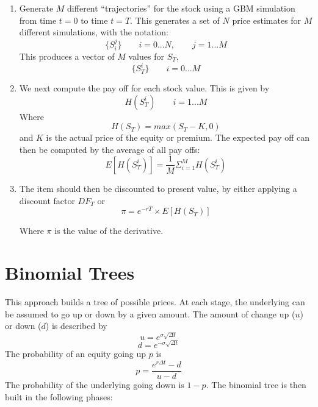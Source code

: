 \begin{enumerate}
	\item Generate $M$ different ``trajectories'' for the stock using a GBM simulation from time $t=0$ to time $t=T$. This generates a set of $N$ price estimates for $M$ different simulations, with the notation:
	\begin{equation}
		\{S_i^j\}\qquad i = 0...N,\qquad j=1...M
	\end{equation}
	This produces a vector of $M$ values for $S_T$, 
	\begin{equation}
		\{S_T^i\}\qquad i = 0...M
	\end{equation}
	
	\item We next compute the pay off for each stock value. This is given by 
	\begin{equation}
		H(S_T^i)\qquad i=1...M
	\end{equation}
	Where 
	\begin{equation}
		H(S_T)=max(S_T-K,0)
	\end{equation}
	and $K$ is the actual price of the equity or premium. The expected pay off can then be computed by the average of all pay offs:
	\begin{equation}
		E[H(S_T^i)]=\frac{1}{M}\Sigma_{i=1}^{M}H(S_T^i)
	\end{equation}
	
	\item The item should then be discounted to present value, by either applying a discount factor $DF_T$ or 
	\begin{equation}
		\pi = e^{-rT}\times E[H(S_T)]
	\end{equation}
	
	Where $\pi$ is the value of the derivative.
\end{enumerate}



\section{Binomial Trees \cite{advancedquantcpp}}

This approach builds a tree of possible prices. At each stage, the underlying can be assumed to go up or down by a given amount. The amount of change up ($u$) or down ($d$) is described by
\begin{equation}
	u=e^{\sigma\sqrt{\Delta{}t}}
\end{equation}
\begin{equation}
	d=e^{-\sigma\sqrt{\Delta{}t}}
\end{equation}
The probability of an equity going up $p$ is
\begin{equation}
p=\frac{e^{r\Delta{}t}-d}{u-d}
\end{equation}
The probability of the underlying going down is $1-p$. The binomial tree is then built in the following phases:

